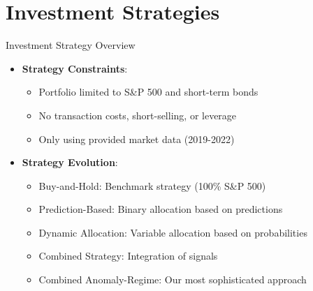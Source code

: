 \documentclass[aspectratio=169,xcolor=dvipsnames]{beamer}
\begin{document}
\section{Investment Strategies}
\begin{frame}{Investment Strategy Overview}
	\begin{itemize}
		\item \textbf{Strategy Constraints}:
		      \begin{itemize}
			      \item Portfolio limited to S\&P 500 and short-term bonds
			      \item No transaction costs, short-selling, or leverage
			      \item Only using provided market data (2019-2022)
		      \end{itemize}
		\item \textbf{Strategy Evolution}:
		      \begin{itemize}
			      \item Buy-and-Hold: Benchmark strategy (100\% S\&P 500)
			      \item Prediction-Based: Binary allocation based on predictions
			      \item Dynamic Allocation: Variable allocation based on probabilities
			      \item Combined Strategy: Integration of signals
			      \item \alert{Combined Anomaly-Regime}: Our most sophisticated approach
		      \end{itemize}
	\end{itemize}
\end{frame}
\end{document}
